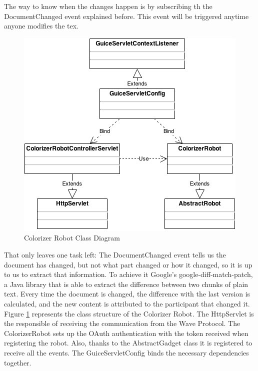 The way to know when the changes happen is by subscribing th the DocumentChanged event explained before. This event will be triggered anytime anyone modifies the tex.\\[.2cm]
\begin{figure}[H]
  \center
    \includegraphics[keepaspectratio, scale=0.5]{Media/Diagrams/Robot/Colorizer.png}
  \caption{Colorizer Robot Class Diagram}
  \label{fig:colorizer_diagram}
\end{figure}
That only leaves one task left: The DocumentChanged event tells us the document has changed, but not what part changed or how it changed, so it is up to us to extract that information. To achieve it Google's google-diff-match-patch, a Java library that is able to extract the difference between two chunks of plain text. Every time the document is changed, the difference with the last version is calculated, and the new content is attributed to the participant that changed it.\\[.2cm]
Figure \ref{fig:colorizer_diagram} represents the class structure of the Colorizer Robot. The HttpServlet is the responsible of receiving the communication from the Wave Protocol. The ColorizerRobot sets up the OAuth authentication with the token received when registering the robot. Also, thanks to the AbstractGadget class it is registered to receive all the events. The GuiceServletConfig binds the necessary dependencies together.
